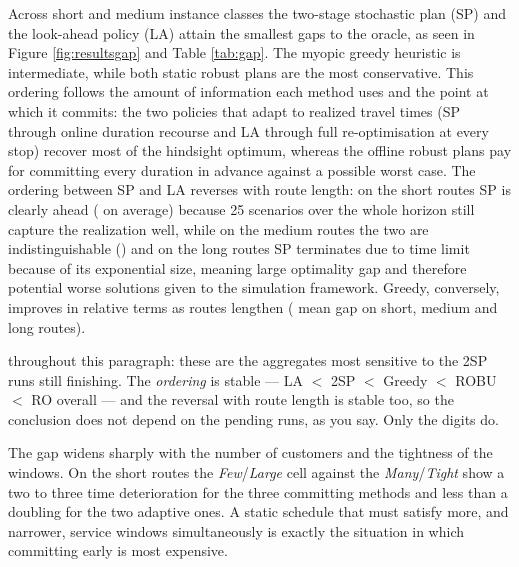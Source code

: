 Across short and medium instance classes the two-stage stochastic plan (SP) and the look-ahead policy (LA) attain the smallest gaps to the oracle, as seen in Figure \ref{fig:resultsgap} and Table \ref{tab:gap}. The myopic greedy heuristic is intermediate, while both static robust plans are the most conservative.
This ordering follows the amount of information each method uses and the point at which it commits: the two policies that adapt to realized travel times (SP through online duration recourse and LA through full re-optimisation at every stop) recover most of the hindsight optimum, whereas the offline robust plans pay for committing every duration in advance against a possible worst case.
The ordering between SP and LA reverses with route length: on the short routes SP is clearly ahead ( on average) because 25 scenarios over the whole horizon still capture the realization well, while on the medium routes the two are indistinguishable () and on the long routes SP terminates due to time limit because of its exponential size, meaning large optimality gap and therefore potential worse solutions given to the simulation framework. Greedy, conversely, improves in relative terms as routes lengthen ( mean gap on short, medium and long routes).

\begin{acmt}
 throughout this paragraph: these are the aggregates most sensitive
to the 2SP runs still finishing. The \emph{ordering} is stable --- LA
 $<$ 2SP  $<$ Greedy  $<$ ROBU
 $<$ RO  overall --- and the reversal with route length
is stable too, so the conclusion does not depend on the pending runs, as you
say. Only the digits do.
\end{acmt}

The gap widens sharply with the number of customers and the tightness of the windows. On the short routes the \emph{Few}/\emph{Large} cell against the \emph{Many}/\emph{Tight} show a two to three time deterioration for the three committing methods and less than a doubling for the two adaptive ones. A static schedule that must satisfy more, and narrower, service windows simultaneously is exactly the situation in which committing early is most expensive.

